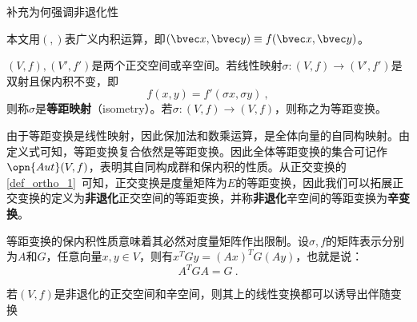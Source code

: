 

\begin{issues}
\issueDraft 补充为何强调非退化性
\end{issues}

本文用$(,)$表广义内积运算，即$(\bvec x,\bvec y)\equiv f(\bvec x,\bvec y) $。
\begin{definition}{}
$(V,f),(V',f')$是两个正交空间或辛空间。若线性映射$\sigma:(V,f)\rightarrow (V',f')$是双射且保内积不变，即\begin{equation}
f(x,y)=f'(\sigma x,\sigma y)~,
\end{equation}
则称$\sigma $是\textbf{等距映射}（isometry）。若$\sigma:(V,f)\rightarrow (V,f)$，则称之为等距变换。
\end{definition}
由于等距变换是线性映射，因此保加法和数乘运算，是全体向量的自同构映射。由定义式可知，等距变换复合依然是等距变换。因此全体等距变换的集合可记作$\opn{Aut}(V,f)$，表明其自同构成群和保内积的性质。从正交变换的\autoref{def_ortho_1}~可知，正交变换是度量矩阵为$E$的等距变换，因此我们可以拓展正交变换的定义为\textbf{非退化}正交空间的等距变换，并称\textbf{非退化}辛空间的等距变换为\textbf{辛变换}。

等距变换的保内积性质意味着其必然对度量矩阵作出限制。设$\sigma,f$的矩阵表示分别为$A$和$G$，任意向量$x,y\in V$，则有$x^{T}Gy=(Ax)^TG(Ay)$，也就是说：
\begin{equation}
A^TGA=G~.
\end{equation}

若$(V,f)$是非退化的正交空间和辛空间，则其上的线性变换都可以诱导出伴随变换